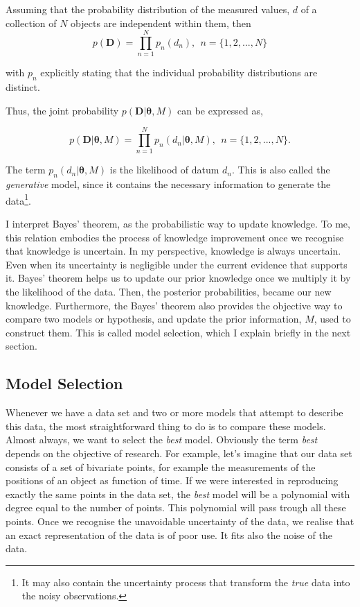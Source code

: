 Assuming that the probability distribution of the measured values, $d$ of a collection of $N$ objects are independent within them, then
\begin{equation}
\label{eq:independence}
 p(\mathbf{D}) = \prod_{n=1}^N p_n(d_n), \ \ n=\{1,2,...,N\}
\end{equation}

 with $p_n$ explicitly stating that the individual probability distributions are distinct. 
 
 Thus, the joint probability $p(\mathbf{D}|\mathbf{\theta},M)$ can be expressed as,

\begin{equation}
 p(\mathbf{D}|\mathbf{\theta},M) = \prod_{n=1}^N p_n(d_n|\mathbf{\theta},M), \ \ n=\{1,2,...,N\}.
\end{equation}

The term $p_n(d_n|\mathbf{\theta},M)$ is the likelihood of datum $d_n$. This is also called the \emph{generative} model, since it  contains the necessary information to generate the data\footnote{It may also contain the uncertainty process that transform the \emph{true} data into the noisy observations.}.

I interpret Bayes' theorem, as the probabilistic way to update knowledge. To me, this relation embodies the process of knowledge improvement once we recognise that knowledge is uncertain. In my perspective, knowledge is always uncertain. Even when its uncertainty is negligible under the current evidence that supports it. Bayes' theorem helps us to update our prior knowledge once we multiply it by the likelihood of the data. Then, the posterior probabilities, became our new knowledge. Furthermore, the Bayes' theorem also provides the objective way to compare two models or hypothesis, and update the prior information, $M$, used to construct them. This is called model selection, which I explain briefly in the next section.

\subsection{Model Selection}
\label{sect:modelselection}

Whenever we have a data set and two or more models that attempt to describe this data, the most straightforward thing to do is to compare these models. Almost always, we want to select the \emph{best} model. Obviously the term \emph{best} depends on the objective of research. For example, let's imagine that our data set consists of a set of bivariate points, for example the measurements of the positions of an object as function of time. If we were interested in reproducing exactly the same points in the data set, the \emph{best} model will be a polynomial with degree equal to the number of points. This polynomial will pass trough all these points. Once we recognise the unavoidable uncertainty of the data, we realise that an exact representation of the data is of poor use. It fits also the noise of the data. 

